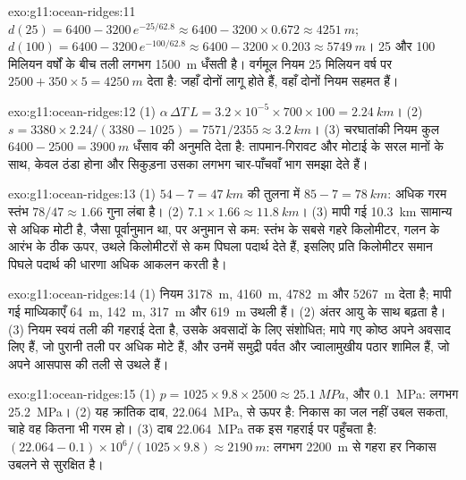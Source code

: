 \begin{solution}{exo:g11:ocean-ridges:11}
$d(25) = 6400 - 3200\,e^{-25/62.8} \approx 6400 - 3200 \times 0.672 \approx
\qty{4251}{m}$; $d(100) = 6400 - 3200\,e^{-100/62.8} \approx 6400 - 3200
\times 0.203 \approx \qty{5749}{m}$। 25 और 100 मिलियन वर्षों के बीच
तली लगभग \qty{1500}{m} धँसती है। वर्गमूल नियम 25 मिलियन वर्ष पर
$2500 + 350 \times 5 = \qty{4250}{m}$ देता है: जहाँ दोनों लागू होते हैं, वहाँ दोनों नियम
सहमत हैं।
\end{solution}

\begin{solution}{exo:g11:ocean-ridges:12}
(1) $\alpha\,\Delta T\,L = 3.2 \times 10^{-5} \times 700 \times 100 =
\qty{2.24}{km}$। (2) $s = 3380 \times 2.24/(3380 - 1025) = 7571/2355 \approx
\qty{3.2}{km}$। (3) चरघातांकी नियम कुल $6400 - 2500 =
\qty{3900}{m}$ धँसाव की अनुमति देता है: तापमान-गिरावट और मोटाई के
सरल मानों के साथ, केवल ठंडा होना और सिकुड़ना उसका लगभग
चार-पाँचवाँ भाग समझा देते हैं।
\end{solution}

\begin{solution}{exo:g11:ocean-ridges:13}
(1) $54 - 7 = \qty{47}{km}$ की तुलना में $85 - 7 = \qty{78}{km}$: अधिक गरम
स्तंभ $78/47 \approx 1.66$ गुना लंबा है। (2) $7.1 \times 1.66 \approx
\qty{11.8}{km}$। (3) मापी गई \qty{10.3}{km} सामान्य से अधिक मोटी है, जैसा
पूर्वानुमान था, पर अनुमान से कम: स्तंभ के सबसे गहरे किलोमीटर,
गलन के आरंभ के ठीक ऊपर, उथले किलोमीटरों से कम पिघला पदार्थ देते हैं, इसलिए
प्रति किलोमीटर समान पिघले पदार्थ की धारणा अधिक आकलन करती है।
\end{solution}

\begin{solution}{exo:g11:ocean-ridges:14}
(1) नियम \qty{3178}{m}, \qty{4160}{m}, \qty{4782}{m} और
\qty{5267}{m} देता है; मापी गई माध्यिकाएँ \qty{64}{m},
\qty{142}{m}, \qty{317}{m} और \qty{619}{m} उथली हैं। (2) अंतर आयु के साथ
बढ़ता है। (3) नियम स्वयं तली की गहराई देता है, उसके
अवसादों के लिए संशोधित; मापे गए कोष्ठ अपने अवसाद लिए हैं, जो
पुरानी तली पर अधिक मोटे हैं, और उनमें समुद्री पर्वत और ज्वालामुखीय पठार शामिल हैं, जो
अपने आसपास की तली से उथले हैं।
\end{solution}

\begin{solution}{exo:g11:ocean-ridges:15}
(1) $p = 1025 \times 9.8 \times 2500 \approx \qty{25.1}{MPa}$, और
\qty{0.1}{MPa}: लगभग \qty{25.2}{MPa}। (2) यह क्रांतिक
दाब, \qty{22.064}{MPa}, से ऊपर है: निकास का जल नहीं उबल सकता, चाहे वह कितना भी गरम हो।
(3) दाब \qty{22.064}{MPa} तक इस गहराई पर पहुँचता है:
$(22.064 - 0.1) \times 10^6/(1025 \times 9.8) \approx \qty{2190}{m}$: लगभग
\qty{2200}{m} से गहरा हर निकास उबलने से सुरक्षित है।
\end{solution}

